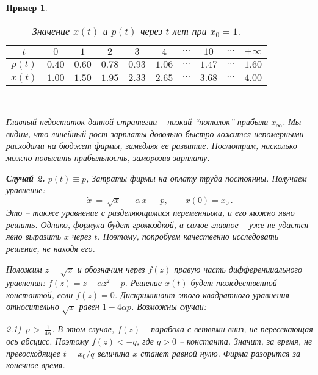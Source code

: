 \documentclass[12pt,a4paper]{article}
\newtheorem{ex}{Пример}
\begin{document}
\begin{ex}
{\begin{table}[thb]
\begin{center}
\begin{tabular}{|c|c|c|c|c|c|c|c|c|c|}\hline
 $t$ & $0$ & $1$ & $2$ & $3$ & $4$ &   $\cdots$ & $10$ & $\cdots$ &  $+\infty$ \\
 \hline 
  $p(t)$ & $0.40$ & $0.60$ & $0.78$ & $0.93$ & $1.06$ & $\cdots$ & $1.47$ & $\cdots$ & $1.60$ \\
  \hline 
  $x(t)$ & $1.00$ & $1.50$ & $1.95$ & $2.33$ & $2.65$ & $\cdots$ & $3.68$ & $\cdots$ & $4.00$ \\
 \hline

\end{tabular} \\[2mm]
\caption{Значение $x(t)$ и $p(t)$ через $t$ лет при $x_0 = 1$.}
\label{tab0}
\end{center}
\end{table}    




 
 Главный недостаток данной стратегии -- низкий ``потолок'' прибыли $x_{\infty}$. Мы видим, что линейный рост 
 зарплаты довольно быстро ложится непомерными расходами на бюджет фирмы, замедляя ее развитие. 
 Посмотрим, насколько можно повысить  прибыльность, заморозив зарплату. 
\smallskip 


\textbf{Случай 2.} $p(t) \equiv p$, Затраты фирмы на оплату труда постоянны. Получаем уравнение:   
 $$
\dot x \ = \  \sqrt{x} \ - \ \alpha \, x \, - \, p  ,\qquad x(0) = x_0\, .  
$$
Это -- также уравнение с разделяющимися переменными, и его можно явно решить. Однако, формула  будет громоздкой, а самое главное --  уже не удастся 
явно выразить $x$ через $t$. Поэтому, попробуем качественно исследовать решение, не находя его. 
\smallskip 

Положим $z = \sqrt{x}$ и обозначим через $f(z)$ правую часть дифференциального уравнения: 
$f(z) = z - \alpha z^2 - p $.  
Решение $x(t)$ будет тождественной константой, если $f(z) = 0$. 
Дискриминант этого квадратного уравнения относительно 
$\sqrt{x}$ равен $1 - 4\alpha p$. Возможны случаи: 
\smallskip 

2.1)  $\, p \, > \, \frac{1}{4\alpha}$. В этом случае, $f(z)$ -- парабола с ветвями вниз, не пересекающая ось абсцисс. Поэтому $f(z) < - q$, где $q > 0$ -- константа. 
Значит, за время, не превосходящее $t = x_0/q$ величина $x$ станет равной нулю. Фирма разорится за конечное время. 
\smallskip 

}
\end{ex}
\end{document}
